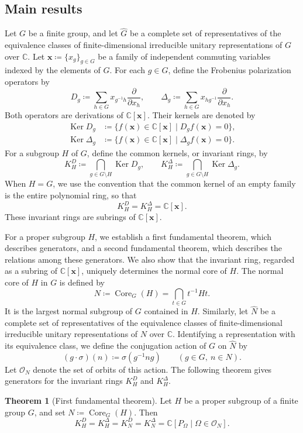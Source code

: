 \documentclass[12pt,a4paper]{article}
\theoremstyle{definition}
\newtheorem{thm}[definition]{Theorem}
\numberwithin{definition}{section}
\DeclareMathOperator{\Ker}{Ker}
\DeclareMathOperator{\Core}{Core}
\begin{document}
\subsection*{Main results}
Let $G$ be a finite group, and let $\widehat G$ be a complete set of
representatives of the equivalence classes of finite-dimensional irreducible
unitary representations of $G$ over $\mathbb C$.
Let $\bm x\coloneqq\{x_g\}_{g\in G}$ be a family of independent commuting
variables indexed by the elements of $G$.
For each $g\in G$, define the Frobenius polarization operators by
\[
D_g\coloneqq\sum_{h\in G}x_{g^{-1}h}\frac{\partial}{\partial x_h},
\qquad
\Delta_g\coloneqq\sum_{h\in G}x_{hg^{-1}}\frac{\partial}{\partial x_h}.
\]
Both operators are derivations of $\mathbb C[\bm x]$.
Their kernels are denoted by
\[
\begin{aligned}
\Ker D_g&\coloneqq\{f(\bm x)\in\mathbb C[\bm x]\mid D_gf(\bm x)=0\},\\
\Ker\Delta_g&\coloneqq\{f(\bm x)\in\mathbb C[\bm x]\mid\Delta_gf(\bm x)=0\}.
\end{aligned}
\]
For a subgroup $H$ of $G$, define the common kernels, or invariant rings, by
\[
K_H^D\coloneqq\bigcap_{g\in G\setminus H}\Ker D_g,
\qquad
K_H^\Delta\coloneqq\bigcap_{g\in G\setminus H}\Ker\Delta_g.
\]
When $H=G$, we use the convention that the common kernel of an empty family is
the entire polynomial ring, so that
\[
K_H^D=K_H^\Delta=\mathbb C[\bm x].
\]
These invariant rings are subrings of $\mathbb C[\bm x]$.

For a proper subgroup $H$, we establish a first fundamental theorem,
which describes generators, and a second fundamental theorem,
which describes the relations among these generators.
We also show that the invariant ring, regarded as a subring of
$\mathbb C[\bm x]$, uniquely determines the normal core of $H$.
The normal core of $H$ in $G$ is defined by
\[
N\coloneqq\Core_G(H)=\bigcap_{t\in G}t^{-1}Ht.
\]
It is the largest normal subgroup of $G$ contained in $H$.
Similarly, let $\widehat N$ be a complete set of representatives of the
equivalence classes of finite-dimensional irreducible unitary representations
of $N$ over $\mathbb C$.
Identifying a representation with its equivalence class, we define the
conjugation action of $G$ on $\widehat N$ by
\[
(g\cdot\sigma)(n)\coloneqq\sigma(g^{-1}ng)
\qquad(g\in G,\ n\in N).
\]
Let $\mathcal O_N$ denote the set of orbits of this action.
The following theorem gives generators for the invariant rings
$K_H^D$ and $K_H^\Delta$.

\begin{thm}[First fundamental theorem]\label{thm:1.1}
Let $H$ be a proper subgroup of a finite group $G$, and set
$N\coloneqq\Core_G(H)$. Then
\[
K_H^D=K_H^\Delta=K_N^D=K_N^\Delta
=\mathbb C[P_\Omega\mid\Omega\in\mathcal O_N].
\]
\end{thm}
\end{document}
